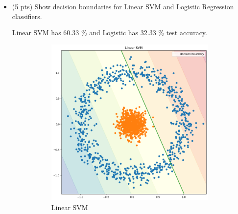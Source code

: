 \documentclass[a4paper]{article}
\theoremstyle{definition}
\newenvironment{soln}{
    \leavevmode\color{blue}\ignorespaces
}{}
\begin{document}
 \begin{itemize}
     \item (5 pts) Show decision boundaries for Linear SVM and Logistic Regression classifiers. 

     \begin{soln}
        Linear SVM has 60.33 \% and Logistic has 32.33 \% test accuracy.
         \begin{figure}[H]
                \centering
                \begin{subfigure}[b]{0.5\textwidth}
                    \centering
                    \includegraphics[scale=0.2]{Images/q2_2_2/SVM_Linear.png}
                    \caption{Linear SVM}
                \end{subfigure}%
                \begin{subfigure}[b]{0.5\textwidth}
                    \centering

\end{subfigure}
\end{figure}
\end{soln}
\end{itemize}
\end{document}
